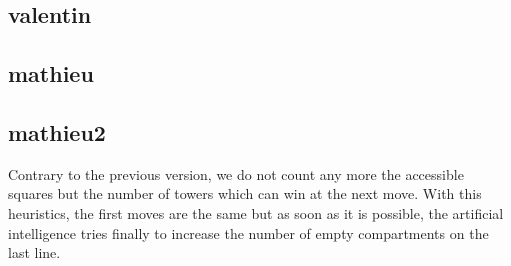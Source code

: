 \documentclass[a4paper, 11pt]{article}
\begin{document}
\subsection{valentin}


\subsection{mathieu}


\subsection{mathieu2}
Contrary to the previous version, we do not count any more the accessible squares but the number of towers which can win at the next move. 
With this heuristics, the first moves are the same but as soon as it is possible, the artificial intelligence tries finally to increase the number of empty compartments on the last line.
\end{document}
